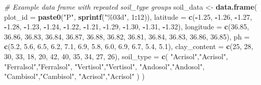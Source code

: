 \documentclass[
  10pt,
  b5paper,
  oneside]{book}
\newenvironment{Shaded}{\begin{snugshade}}{\end{snugshade}}
\newcommand{\AttributeTok}[1]{\textcolor[rgb]{0.13,0.29,0.53}{#1}}
\newcommand{\CommentTok}[1]{\textcolor[rgb]{0.56,0.35,0.01}{\textit{#1}}}
\newcommand{\DecValTok}[1]{\textcolor[rgb]{0.00,0.00,0.81}{#1}}
\newcommand{\FloatTok}[1]{\textcolor[rgb]{0.00,0.00,0.81}{#1}}
\newcommand{\FunctionTok}[1]{\textcolor[rgb]{0.13,0.29,0.53}{\textbf{#1}}}
\newcommand{\NormalTok}[1]{#1}
\newcommand{\OtherTok}[1]{\textcolor[rgb]{0.56,0.35,0.01}{#1}}
\newcommand{\SpecialCharTok}[1]{\textcolor[rgb]{0.81,0.36,0.00}{\textbf{#1}}}
\newcommand{\StringTok}[1]{\textcolor[rgb]{0.31,0.60,0.02}{#1}}
\begin{document}
\begin{Shaded}
\begin{Highlighting}[]
\CommentTok{\# Example data frame with repeated soil\_type groups}
\NormalTok{soil\_data }\OtherTok{\textless{}{-}} \FunctionTok{data.frame}\NormalTok{(}
  \AttributeTok{plot\_id =} \FunctionTok{paste0}\NormalTok{(}\StringTok{"P"}\NormalTok{, }\FunctionTok{sprintf}\NormalTok{(}\StringTok{"\%03d"}\NormalTok{, }\DecValTok{1}\SpecialCharTok{:}\DecValTok{12}\NormalTok{)),}
  \AttributeTok{latitude =} \FunctionTok{c}\NormalTok{(}\SpecialCharTok{{-}}\FloatTok{1.25}\NormalTok{, }\SpecialCharTok{{-}}\FloatTok{1.26}\NormalTok{, }\SpecialCharTok{{-}}\FloatTok{1.27}\NormalTok{, }\SpecialCharTok{{-}}\FloatTok{1.28}\NormalTok{, }\SpecialCharTok{{-}}\FloatTok{1.23}\NormalTok{, }\SpecialCharTok{{-}}\FloatTok{1.24}\NormalTok{, }\SpecialCharTok{{-}}\FloatTok{1.22}\NormalTok{, }\SpecialCharTok{{-}}\FloatTok{1.21}\NormalTok{, }\SpecialCharTok{{-}}\FloatTok{1.29}\NormalTok{, }\SpecialCharTok{{-}}\FloatTok{1.30}\NormalTok{, }\SpecialCharTok{{-}}\FloatTok{1.31}\NormalTok{, }\SpecialCharTok{{-}}\FloatTok{1.32}\NormalTok{),}
  \AttributeTok{longitude =} \FunctionTok{c}\NormalTok{(}\FloatTok{36.85}\NormalTok{, }\FloatTok{36.86}\NormalTok{, }\FloatTok{36.83}\NormalTok{, }\FloatTok{36.84}\NormalTok{, }\FloatTok{36.87}\NormalTok{, }\FloatTok{36.88}\NormalTok{, }\FloatTok{36.82}\NormalTok{, }\FloatTok{36.81}\NormalTok{, }\FloatTok{36.84}\NormalTok{, }\FloatTok{36.83}\NormalTok{, }\FloatTok{36.86}\NormalTok{, }\FloatTok{36.85}\NormalTok{),}
  \AttributeTok{ph =} \FunctionTok{c}\NormalTok{(}\FloatTok{5.2}\NormalTok{, }\FloatTok{5.6}\NormalTok{, }\FloatTok{6.5}\NormalTok{, }\FloatTok{6.2}\NormalTok{, }\FloatTok{7.1}\NormalTok{, }\FloatTok{6.9}\NormalTok{, }\FloatTok{5.8}\NormalTok{, }\FloatTok{6.0}\NormalTok{, }\FloatTok{6.9}\NormalTok{, }\FloatTok{6.7}\NormalTok{, }\FloatTok{5.4}\NormalTok{, }\FloatTok{5.1}\NormalTok{),}
  \AttributeTok{clay\_content =} \FunctionTok{c}\NormalTok{(}\DecValTok{25}\NormalTok{, }\DecValTok{28}\NormalTok{, }\DecValTok{30}\NormalTok{, }\DecValTok{33}\NormalTok{, }\DecValTok{18}\NormalTok{, }\DecValTok{20}\NormalTok{, }\DecValTok{42}\NormalTok{, }\DecValTok{40}\NormalTok{, }\DecValTok{35}\NormalTok{, }\DecValTok{34}\NormalTok{, }\DecValTok{27}\NormalTok{, }\DecValTok{26}\NormalTok{),}
  \AttributeTok{soil\_type =} \FunctionTok{c}\NormalTok{(}
    \StringTok{"Acrisol"}\NormalTok{,}\StringTok{"Acrisol"}\NormalTok{,}
    \StringTok{"Ferralsol"}\NormalTok{,}\StringTok{"Ferralsol"}\NormalTok{,}
    \StringTok{"Vertisol"}\NormalTok{,}\StringTok{"Vertisol"}\NormalTok{,}
    \StringTok{"Andosol"}\NormalTok{,}\StringTok{"Andosol"}\NormalTok{,}
    \StringTok{"Cambisol"}\NormalTok{,}\StringTok{"Cambisol"}\NormalTok{,}
    \StringTok{"Acrisol"}\NormalTok{,}\StringTok{"Acrisol"}
\NormalTok{  )}
\NormalTok{)}


\end{Highlighting}
\end{Shaded}
\end{document}
